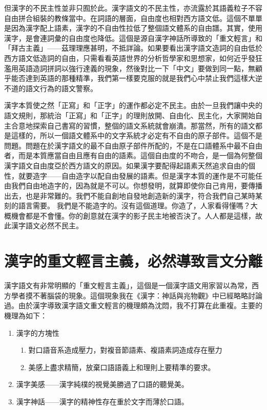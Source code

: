 \documentclass[a5paper, 12pt, openany]{book} %
\begin{document}
但漢字的不民主性並非只囿於此。漢字語文的不民主性，亦流露於其語義粒子不容自由拼合組裝的教條當中。在詞語的層面，自由度也相對西方語文低。這個不單單是因為漢字配上語素，漢字的不自由性拉低了整個語文體系的自由譜。其實，使用漢字，是會連詞彙的自由度也降低。這個是源自漢字神話所導致的「重文輕言」和「拜古主義」——茲理理應甚明，不抵詳論。如果要看出漢字語文造詞的自由低於西方語文低造詞的自由，只需看看英語世界的分析哲學家和思想家，如何近乎發狂濫用英語造詞拼詞以強行達義的現象，然後對比一下「中文」要做到同一點，無顧乎能否達到英語的那種精準，我們第一樣要克服的就是我們心中禁止我們這樣大逆不道的語文行為的語文警察。

漢字本質使之然「正寫」和「正字」的運作都必定不民主。由於一旦我們讓中央的語文規則，那統治「正寫」和「正字」的理則放開、自由化、民主化，大家開始自主合意地探索自己書寫的習慣，整個的語文系統就會崩潰。那當然，所有的語文都是這樣的，所以一個語文體系中的文字系統才必定有不自由的原子部件。這個不是問題。問題在於漢字語文的最不自由原子部件所配的，不是在口語體系中最不自由者，而是本質應當自由且應有自由的語素。這個自由度的不吻合，是一個為何整個漢字語文自由度亞於西方語文的原因。如果漢字要配得起語素天然追求自由的個性，就要造字——自由造字以配自由發展的語素。但是漢字本質的運作是不可能任由我們自由地造字的，因為就是不可以。你想發明，就算即使你自己肯用，要傳播出去，也是非常難的。我們不能自創地自發地創造新的漢字，符合我們自己某時某刻的語言需要。 我們是不能造字的。沒有這個道理。你造了，人家看得懂嗎？大概機會都是不會懂。你的創意就在漢字的影子民主地被否決了。人人都是這樣，故此漢字語文必然不民主。

\section{漢字的重文輕言主義，必然導致言文分離}

漢字語文有非常明顯的「重文輕言主義」，這個是一個漢字語文用家習以為常，西方學者摸不著腦袋的現象。這個現象我在《漢字：神話與兆物觀》中已經略略討論過。由於漢字導致漢字語文重文輕言的機理頗為沈悶，我不打算在此重複。主要的機理為如下：

\begin{enumerate}
\item 漢字的方塊性
  \begin{enumerate}
	\item 對口語音系造成壓力，對複音節語素、複語素詞造成存在壓力
	\item 美感上盡求精簡，放棄口語語義上和理則上要精準的要求。
  \end{enumerate}
\item 漢字美感——漢字純樸的視覺美勝過了口語的聽覺美。
\item 漢字神話——漢字的精神性存在重於文字而薄於口語。
\end{enumerate}
\end{document}
